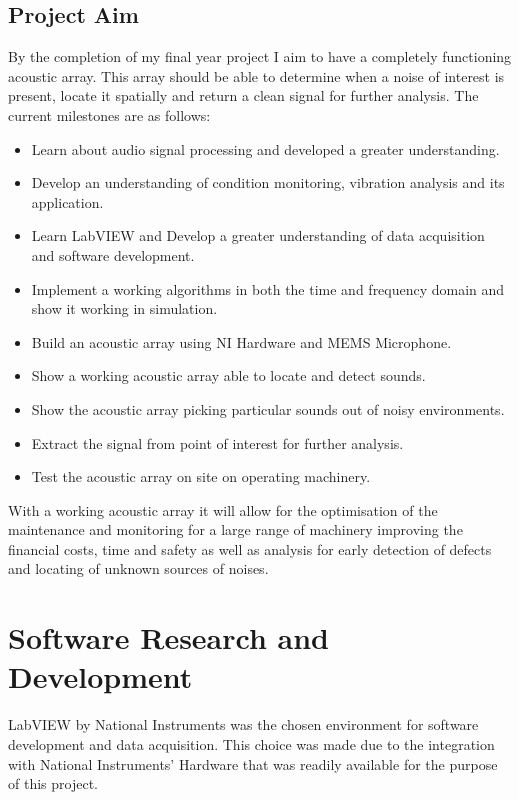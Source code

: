 \documentclass{UoNMCHA}
\numberwithin{equation}{section}
\begin{document}
\subsection{Project Aim} \label{sec:Project  Aim}
    By the completion of my final year project I aim to have a completely functioning acoustic array. This array should be able to determine when a noise of interest is present, locate it spatially and return a clean signal for further analysis. The current milestones are as follows:
    
    \begin{itemize}
        \item Learn about audio signal processing and developed a greater understanding.
        \item Develop an understanding of condition monitoring, vibration analysis and its application.
        \item Learn LabVIEW and Develop a greater understanding of data acquisition and software development.
        \item Implement a working algorithms in both the time and frequency domain and show it working in simulation.
        \item Build an acoustic array using NI Hardware and MEMS Microphone.
        \item Show a working acoustic array able to locate and detect sounds.
        \item Show the acoustic array picking particular sounds out of noisy environments.
        \item Extract the signal from point of interest for further analysis.
        \item Test the acoustic array on site on operating machinery.
    \end{itemize}
    
    With a working acoustic array it will allow for the optimisation of the maintenance and monitoring for a large range of machinery improving the financial costs, time and safety as well as analysis for early detection of defects and locating of unknown sources of noises.
\newpage
\section{Software Research and Development} \label{sec:Software}

    LabVIEW by National Instruments was the chosen environment for software development and data acquisition. This choice was made due to the integration with National Instruments' Hardware that was readily available for the purpose of this project. 
    
\end{document}
